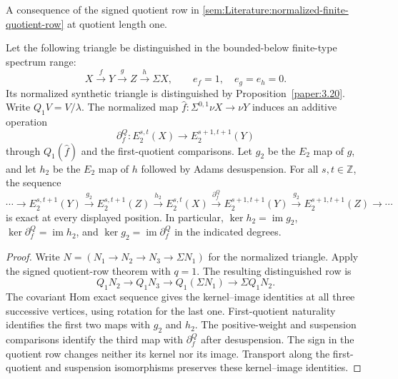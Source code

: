 \begin{theorem}
\label{sem:Literature:normalized-e2-long-exact}
A consequence of the signed quotient row in
\ref{sem:Literature:normalized-finite-quotient-row} at quotient length one.\par
Let the following triangle be distinguished in the bounded-below
finite-type spectrum range:
\[
X\xrightarrow fY\xrightarrow gZ\xrightarrow h\Sigma X,
\qquad e_f=1,\quad e_g=e_h=0.
\]
Its normalized synthetic triangle is distinguished by
Proposition~\ref{paper:3.20}.
Write $Q_1V=V/\lambda$. The normalized map
$\widehat f:\Sigma^{0,1}\nu X\to\nu Y$ induces an additive operation
\[
\partial_f^Q:E_2^{s,t}(X)\longrightarrow E_2^{s+1,t+1}(Y)
\]
through $Q_1(\widehat f)$ and the first-quotient comparisons.
Let $g_2$ be the $E_2$ map of $g$, and let $h_2$ be the
$E_2$ map of $h$ followed by Adams desuspension.
For all $s,t\in\mathbb Z$, the sequence
\[
\cdots\longrightarrow E_2^{s,t+1}(Y)\xrightarrow{g_2}
E_2^{s,t+1}(Z)\xrightarrow{h_2}E_2^{s,t}(X)
\xrightarrow{\partial_f^Q}E_2^{s+1,t+1}(Y)
\xrightarrow{g_2}E_2^{s+1,t+1}(Z)\longrightarrow\cdots
\]
is exact at every displayed position. In particular,
$\ker h_2=\operatorname{im}g_2$,
$\ker\partial_f^Q=\operatorname{im}h_2$, and
$\ker g_2=\operatorname{im}\partial_f^Q$ in the indicated degrees.

\end{theorem}
\begin{proof}
Write $N=(N_1\to N_2\to N_3\to\Sigma N_1)$ for the normalized
triangle. Apply the signed quotient-row theorem with $q=1$. The
resulting distinguished row is
\[
Q_1N_2\longrightarrow Q_1N_3\longrightarrow Q_1(\Sigma N_1)
\longrightarrow\Sigma Q_1N_2.
\]
The covariant Hom exact sequence gives the kernel--image identities at
all three successive vertices, using rotation for the last one.
First-quotient naturality identifies the first two maps with
$g_2$ and $h_2$. The positive-weight and suspension comparisons
identify the third map with $\partial_f^Q$ after desuspension.
The sign in the quotient row changes neither its kernel nor its image.
Transport along the first-quotient and suspension isomorphisms
preserves these kernel--image identities.
\end{proof}

